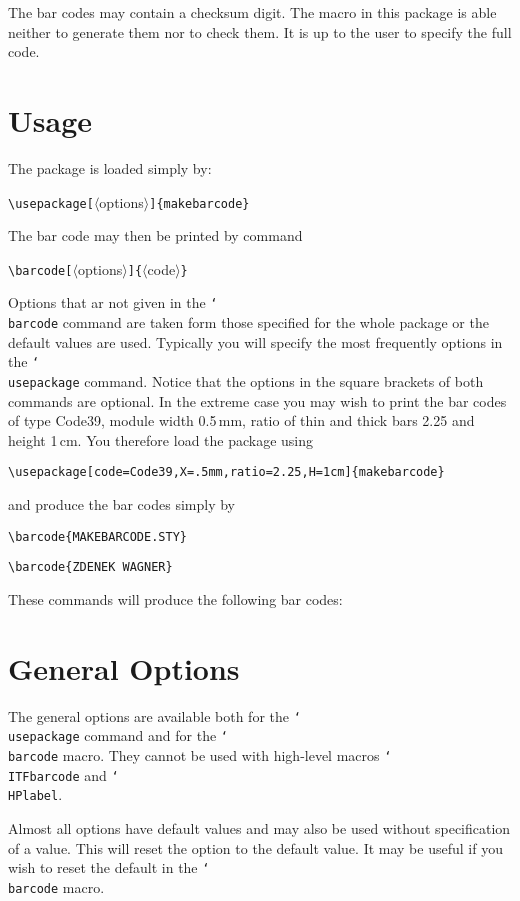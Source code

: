 \documentclass[11pt]{article}
\DeclareRobustCommand\cmd[1]{\texttt{\char`\\#1}}
\def\bcd#{\barcode[code=Code39,X=.5mm,ratio=2.25,H=1cm]}
\let\zwcomma\,
\def\,{\texorpdfstring{\zwcomma}{}}
\begin{document}
The bar codes may contain a checksum digit. The macro in this package is able neither to generate
them nor to check them. It is up to the user to specify the full code.

\section{Usage}\label{usage}
The package is loaded simply by:

\vb
\verb;\usepackage[;$\langle$options$\rangle$\verb;]{makebarcode};

\vb\noindent
The bar code may then be printed by command

\vb
\verb;\barcode[;$\langle$options$\rangle$\verb;]{;$\langle$code$\rangle$\verb;};

\vb
Options that ar not given in the \cmd{barcode} command are taken form those specified for the whole
package or the default values are used. Typically you will specify the most frequently options in
the \cmd{usepackage} command. Notice that the options in the square brackets of both commands are
optional. In the extreme case you may wish to print the bar codes of type Code39, module width
0.5\,mm, ratio of thin and thick bars 2.25 and height 1\,cm. You therefore load the package using

\vb
\verb;\usepackage[code=Code39,X=.5mm,ratio=2.25,H=1cm]{makebarcode};

\vb\noindent
and produce the bar codes simply by

\vb
\verb;\barcode{MAKEBARCODE.STY};\par
\verb;\barcode{ZDENEK WAGNER};

\vb\noindent
These commands will produce the following bar codes:

\vb
\begin{center}

\end{center}

\section{General Options}
The general options are available both for the \cmd{usepackage} command and for the \cmd{barcode}
macro. They cannot be used with high-level macros \cmd{ITFbarcode} and \cmd{HPlabel}.

Almost all options have default values and may also be used without specification of a value. This will
reset the option to the default value. It may be useful if you wish to reset the default in the
\cmd{barcode} macro.
\end{document}
